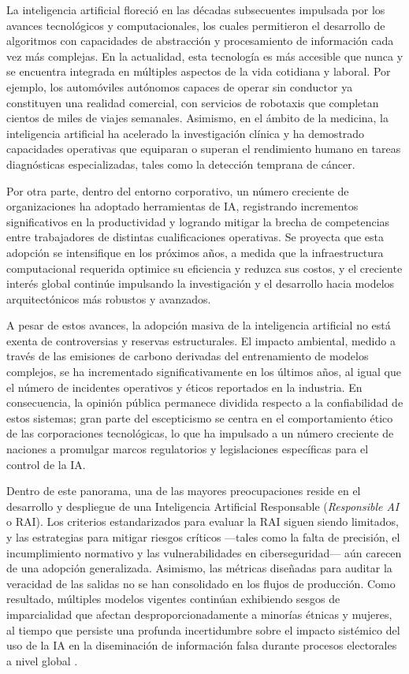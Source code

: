 La inteligencia artificial floreció en las décadas subsecuentes impulsada por los avances tecnológicos y 
computacionales, los cuales permitieron el desarrollo de algoritmos con capacidades de abstracción y procesamiento 
de información cada vez más complejas. En la actualidad, esta tecnología es más accesible que nunca y se encuentra 
integrada en múltiples aspectos de la vida cotidiana y laboral. Por ejemplo, los automóviles autónomos capaces de 
operar sin conductor ya constituyen una realidad comercial, con servicios de robotaxis que completan cientos de miles 
de viajes semanales. Asimismo, en el ámbito de la medicina, la inteligencia artificial ha acelerado la investigación 
clínica y ha demostrado capacidades operativas que equiparan o superan el rendimiento humano en tareas diagnósticas 
especializadas, tales como la detección temprana de cáncer. 
\medskip

Por otra parte, dentro del entorno corporativo, un número creciente de organizaciones ha adoptado herramientas de IA, 
registrando incrementos significativos en la productividad y logrando mitigar la brecha de competencias entre 
trabajadores de distintas cualificaciones operativas. Se proyecta que esta adopción se intensifique en los próximos 
años, a medida que la infraestructura computacional requerida optimice su eficiencia y reduzca sus costos, y el 
creciente interés global continúe impulsando la investigación y el desarrollo hacia modelos arquitectónicos más 
robustos y avanzados.
\medskip

A pesar de estos avances, la adopción masiva de la inteligencia artificial no está exenta de controversias y reservas 
estructurales. El impacto ambiental, medido a través de las emisiones de carbono derivadas del entrenamiento de modelos 
complejos, se ha incrementado significativamente en los últimos años, al igual que el número de incidentes operativos 
y éticos reportados en la industria. En consecuencia, la opinión pública permanece dividida respecto a la confiabilidad 
de estos sistemas; gran parte del escepticismo se centra en el comportamiento ético de las corporaciones tecnológicas, 
lo que ha impulsado a un número creciente de naciones a promulgar marcos regulatorios y legislaciones específicas para 
el control de la IA.
\medskip

Dentro de este panorama, una de las mayores preocupaciones reside en el desarrollo y despliegue de una Inteligencia 
Artificial Responsable (\textit{Responsible AI} o RAI). Los criterios estandarizados para evaluar la RAI siguen siendo 
limitados, y las estrategias para mitigar riesgos críticos —tales como la falta de precisión, el incumplimiento 
normativo y las vulnerabilidades en ciberseguridad— aún carecen de una adopción generalizada. Asimismo, las métricas 
diseñadas para auditar la veracidad de las salidas no se han consolidado en los flujos de producción. Como resultado, 
múltiples modelos vigentes continúan exhibiendo sesgos de imparcialidad que afectan desproporcionadamente a minorías 
étnicas y mujeres, al tiempo que persiste una profunda incertidumbre sobre el impacto sistémico del uso de la IA en 
la diseminación de información falsa durante procesos electorales a nivel global \parencite{maslej2025artificial,bughin2017artificial}.
\medskip

